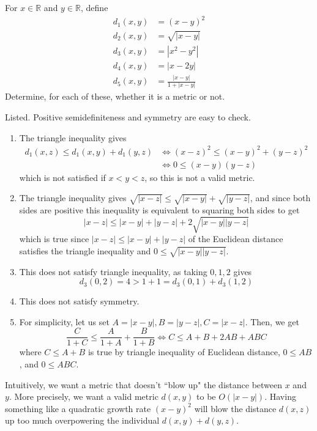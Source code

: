 \documentclass{article}
\begin{document}
    \begin{exercise}[Rudin 2.11]
    For $x \in \mathbb{R}$ and $y \in \mathbb{R}$, define 
    \begin{align*}
        d_1 (x, y) & = (x - y)^2 \\ 
        d_2 (x, y) & = \sqrt{|x - y|}\\ 
        d_3 (x, y) & = |x^2 - y^2| \\ 
        d_4 (x, y) & = |x - 2y| \\ 
        d_5 (x, y) & = \frac{|x - y|}{1 + |x - y|}
    \end{align*}
    Determine, for each of these, whether it is a metric or not. 
    \end{exercise}
    \begin{solution}
    Listed. Positive semidefiniteness and symmetry are easy to check. 
    \begin{enumerate}
        \item The triangle inequality gives 
        \begin{align*}
            d_1 (x, z) \leq d_1 (x, y) + d_1 (y, z) & \iff (x - z)^2 \leq (x - y)^2 + (y - z)^2 \\
            & \iff 0 \leq (x - y) (y - z)
        \end{align*}
        which is not satisfied if $x < y < z$, so this is not a valid metric. 
        
        \item The triangle inequality gives $\sqrt{|x - z|} \leq \sqrt{|x - y|} + \sqrt{|y - z|}$, and since both sides are positive this inequality is equivalent to squaring both sides to get 
        \[|x - z| \leq |x - y| + |y - z| + 2 \sqrt{|x - y| |y - z|}\]
        which is true since $|x - z| \leq |x - y| + |y - z|$ of the Euclidean distance satisfies the triangle inequality and $0 \leq \sqrt{|x - y| |y - z|}$. 
        
        \item This does not satisfy triangle inequality, as taking $0, 1, 2$ gives 
        \[d_3 (0, 2) = 4 > 1 + 1 = d_3 (0, 1) + d_3 (1, 2)\]
        
        \item This does not satisfy symmetry. 
        
        \item For simplicity, let us set $A = |x - y|, B = |y - z|, C = |x - z|$. Then, we get 
        \[\frac{C}{1 + C} \leq \frac{A}{1 + A} + \frac{B}{1 + B} \iff C \leq A + B + 2 AB + ABC\]
        where $C \leq A + B$ is true by triangle inequality of Euclidean distance, $0 \leq AB$, and $0 \leq ABC$. 
        
    \end{enumerate}
    Intuitively, we want a metric that doesn't ``blow up" the distance between $x$ and $y$. More precisely, we want a valid metric $d(x, y)$ to be $O(|x - y|)$. Having something like a quadratic growth rate $(x - y)^2$ will blow the distance $d(x, z)$ up too much overpowering the individual $d(x, y) + d(y, z)$. 
    \end{solution}
\end{document}
